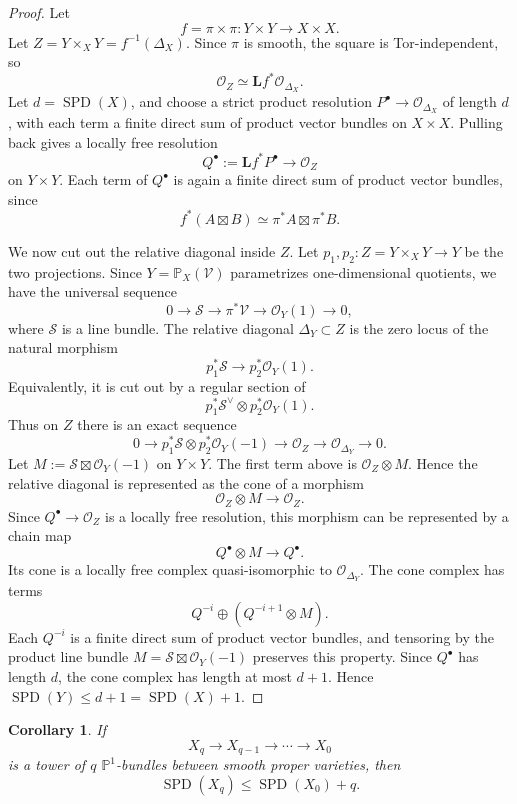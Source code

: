 \documentclass[11pt]{amsart}
\numberwithin{equation}{section}
\newtheorem{corollary}[theorem]{Corollary}
\theoremstyle{definition}
\DeclareMathOperator{\SPD}{SPD}
\begin{document}
\begin{proof}
Let
\[
f=\pi\times\pi:Y\times Y\to X\times X.
\]
Let $Z=Y\times_XY=f^{-1}(\Delta_X)$. Since $\pi$ is smooth, the square is Tor-independent, so
\[
\mathcal O_Z\simeq \mathbf L f^*\mathcal O_{\Delta_X}.
\]
Let $d=\SPD(X)$, and choose a strict product resolution $P^\bullet\to\mathcal O_{\Delta_X}$ of length $d$, with each term a finite direct sum of product vector bundles on $X\times X$. Pulling back gives a locally free resolution
\[
Q^\bullet:=\mathbf L f^*P^\bullet\to\mathcal O_Z
\]
on $Y\times Y$. Each term of $Q^\bullet$ is again a finite direct sum of product vector bundles, since
\[
f^*(A\boxtimes B)\simeq \pi^*A\boxtimes \pi^*B.
\]

We now cut out the relative diagonal inside $Z$. Let $p_1,p_2:Z=Y\times_XY\to Y$ be the two projections. Since $Y=\mathbb P_X(\mathcal V)$ parametrizes one-dimensional quotients, we have the universal sequence
\[
0\to \mathcal S\to \pi^*\mathcal V\to \mathcal O_Y(1)\to0,
\]
where $\mathcal S$ is a line bundle. The relative diagonal $\Delta_Y\subset Z$ is the zero locus of the natural morphism
\[
p_1^*\mathcal S\longrightarrow p_2^*\mathcal O_Y(1).
\]
Equivalently, it is cut out by a regular section of
\[
p_1^*\mathcal S^\vee\otimes p_2^*\mathcal O_Y(1).
\]
Thus on $Z$ there is an exact sequence
\[
0\to
p_1^*\mathcal S\otimes p_2^*\mathcal O_Y(-1)
\longrightarrow
\mathcal O_Z
\longrightarrow
\mathcal O_{\Delta_Y}
\to0.
\]
Let $M:=\mathcal S\boxtimes \mathcal O_Y(-1)$ on $Y\times Y$. The first term above is $\mathcal O_Z\otimes M$. Hence the relative diagonal is represented as the cone of a morphism
\[
\mathcal O_Z\otimes M\longrightarrow \mathcal O_Z.
\]
Since $Q^\bullet\to\mathcal O_Z$ is a locally free resolution, this morphism can be represented by a chain map
\[
Q^\bullet\otimes M\longrightarrow Q^\bullet.
\]
Its cone is a locally free complex quasi-isomorphic to $\mathcal O_{\Delta_Y}$. The cone complex has terms
\[
Q^{-i}\oplus (Q^{-i+1}\otimes M).
\]
Each $Q^{-i}$ is a finite direct sum of product vector bundles, and tensoring by the product line bundle $M=\mathcal S\boxtimes\mathcal O_Y(-1)$ preserves this property. Since $Q^\bullet$ has length $d$, the cone complex has length at most $d+1$. Hence $\SPD(Y)\le d+1=\SPD(X)+1$.
\end{proof}

\begin{corollary}
If
\[
X_q\to X_{q-1}\to\cdots\to X_0
\]
is a tower of $q$ $\mathbb P^1$-bundles between smooth proper varieties, then
\[
\SPD(X_q)\le \SPD(X_0)+q.
\]
\end{corollary}
\end{document}
